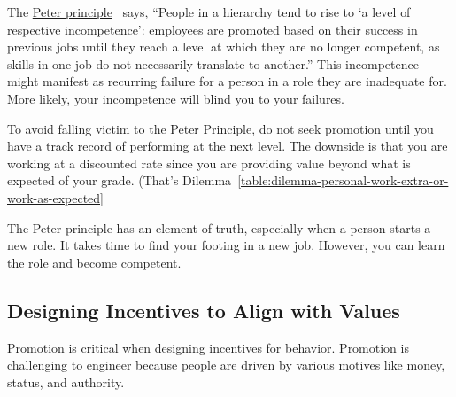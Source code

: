 The \href{https://en.wikipedia.org/wiki/Peter_principle}{Peter principle}~\cite{1970_Peter} says, 
%
%
%
``People in a hierarchy tend to rise to `a level of respective incompetence': employees are promoted based on their success in previous jobs until they reach a level at which they are no longer competent, as skills in one job do not necessarily translate to another.''
This incompetence might manifest as recurring failure for a person in a role they are inadequate for. More likely, your incompetence will blind you to your failures.

To avoid falling victim to the Peter Principle, do not seek promotion until you have a track record of performing at the next level. The downside is that you are working at a discounted rate since you are providing value beyond what is expected of your grade. (That's Dilemma~\ref{table:dilemma-personal-work-extra-or-work-as-expected}\iftoggle{haspagenumbers}{ on page~\pageref{table:dilemma-personal-work-extra-or-work-as-expected}.)}{.)} 


The Peter principle has an element of truth, especially when a person starts a new role. It takes time to find your footing in a new job. However, you can learn the role and become competent. %


\subsection*{Designing Incentives to Align with Values}
Promotion is critical when designing incentives for behavior. Promotion is challenging to engineer because people are driven by various motives like money, status, and authority. 


